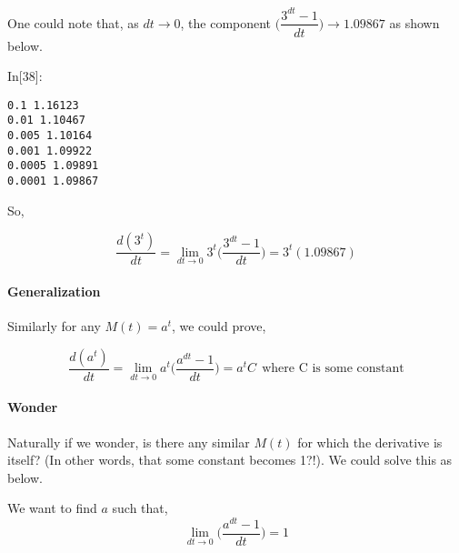 \documentclass[float=false,crop=false]{standalone}
\begin{document}
    One could note that, as \(dt \to 0\), the component
\(\Big( \dfrac{3^{dt}-1}{dt} \Big) \to 1.09867\) as shown below.
\begin{InVerbatim}[commandchars=\\\{\},fontsize=\scriptsize]
{\color{incolor}In[{\color{incolor}38}]:}   \PY{p}{[}    \PY{p}{]}
           \PY{p}{[}     \PY{p}{]}
\end{InVerbatim}
    \begin{Verbatim}[commandchars=\\\{\},fontsize=\footnotesize]
0.1 1.16123
0.01 1.10467
0.005 1.10164
0.001 1.09922
0.0005 1.09891
0.0001 1.09867

    \end{Verbatim}

    So,

\begin{equation}
    \dfrac{d(3^t)}{dt} = \lim_{dt \to 0} 3^t\Big(\dfrac{3^{dt}-1}{dt}\Big) = 3^t(1.09867)
\end{equation}

    \paragraph{Generalization}\label{generalization}

Similarly for any \(M(t) = a^t\), we could prove,

\begin{equation}
    \dfrac{d(a^t)}{dt} = \lim_{dt \to 0} a^t\Big(\dfrac{a^{dt}-1}{dt}\Big) = a^tC \ \ \text{where C is some constant}
\end{equation}

    \paragraph{Wonder}\label{wonder}

Naturally if we wonder, is there any similar \(M(t)\) for which the
derivative is itself? (In other words, that some constant becomes 1?!).
We could solve this as below.

We want to find \(a\) such that,\\
\[
\lim_{dt \to 0} \Big(\dfrac{a^{dt}-1}{dt}\Big) = 1
\]
\end{document}
